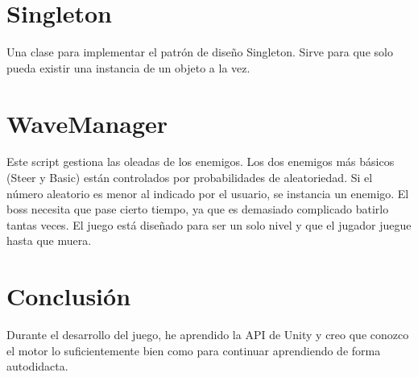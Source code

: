 \documentclass[titlepage, 4apaper]{article}
\begin{document}
\section{Singleton}
Una clase para implementar el patrón de diseño Singleton. Sirve para que solo pueda existir una instancia de un objeto a la vez.
\section{WaveManager}
Este script gestiona las oleadas de los enemigos. Los dos enemigos más básicos (Steer y Basic) están controlados por probabilidades de aleatoriedad. Si el número aleatorio es menor al indicado por el usuario, se instancia un enemigo. El boss necesita que pase cierto tiempo, ya que es demasiado complicado batirlo tantas veces. El juego está diseñado para ser un solo nivel y que el jugador juegue hasta que muera.
\section{Conclusión}
Durante el desarrollo del juego, he aprendido la API de Unity y creo que conozco el motor lo suficientemente bien como para continuar aprendiendo de forma autodidacta.
\end{document}

